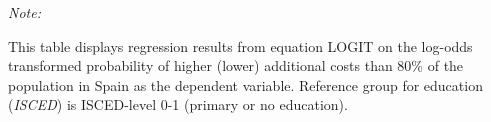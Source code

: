 \begin{table}[htbp!]
\begin{adjustbox}{width = 1\textwidth, max height = 0.95\textheight, center}
\begin{threeparttable}[b]
         \begin{tablenotes}\item \medskip \textit{Note:}
            \item This table displays regression results from equation LOGIT on the log-odds transformed probability of higher (lower) additional costs than 80\% of the population in Spain as the dependent variable. Reference group for education (\textit{ISCED}) is ISCED-level 0-1 (primary or no education).
         \end{tablenotes}
      \end{threeparttable}
   \end{adjustbox}
\end{table}


